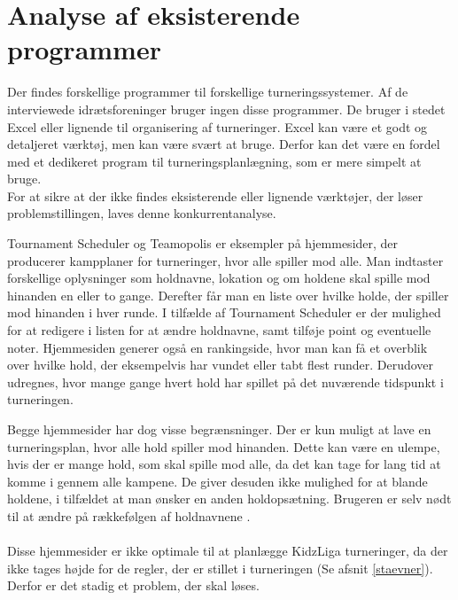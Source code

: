 \section{Analyse af eksisterende programmer}\label{eksisterendeProgrammer}
Der findes forskellige programmer til forskellige turneringssystemer. Af de interviewede idrætsforeninger bruger ingen disse programmer. De bruger i stedet Excel eller lignende til organisering af turneringer. Excel kan være et godt og detaljeret værktøj, men kan være svært at bruge. Derfor kan det være en fordel med et dedikeret program til turneringsplanlægning, som er mere simpelt at bruge.\\
For at sikre at der ikke findes eksisterende eller lignende værktøjer, der løser problemstillingen, laves denne konkurrentanalyse.
\par
Tournament Scheduler og Teamopolis er eksempler på hjemmesider, der producerer kampplaner for turneringer, hvor alle spiller mod alle. Man indtaster forskellige oplysninger som holdnavne, lokation og om holdene skal spille mod hinanden en eller to gange. Derefter får man en liste over hvilke holde, der spiller mod hinanden i hver runde. I tilfælde af Tournament Scheduler er der mulighed for at redigere i listen for at ændre holdnavne, samt tilføje point og eventuelle noter. Hjemmesiden generer også en rankingside, hvor man kan få et overblik over hvilke hold, der eksempelvis har vundet eller tabt flest runder. Derudover udregnes, hvor mange gange hvert hold har spillet på det nuværende tidspunkt i turneringen.
\par
Begge hjemmesider har dog visse begrænsninger. Der er kun muligt at lave en turneringsplan, hvor alle hold spiller mod hinanden. Dette kan være en ulempe, hvis der er mange hold, som skal spille mod alle, da det kan tage for lang tid at komme i gennem alle kampene. De giver desuden ikke mulighed for at blande holdene, i tilfældet at man ønsker en anden holdopsætning. Brugeren er selv nødt til at ændre på rækkefølgen af holdnavnene \citep{Teamopolis}\citep{TournamentScheduler}.
\\\\
Disse hjemmesider er ikke optimale til at planlægge KidzLiga turneringer, da der ikke tages højde for de regler, der er stillet i turneringen (Se afsnit \ref{staevner}). Derfor er det stadig et problem, der skal løses. 